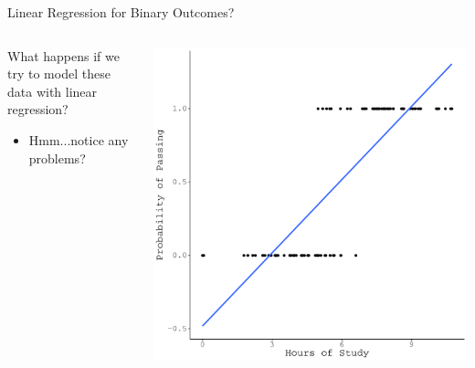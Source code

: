 \documentclass{beamer}\usepackage[]{graphicx}\usepackage[]{color}
\makeatletter
\def\maxwidth{ %
  \ifdim\Gin@nat@width>\linewidth
    \linewidth
  \else
    \Gin@nat@width
  \fi
}
\newenvironment{knitrout}{}{} %
\makeatother
\begin{document}

\begin{frame}{Linear Regression for Binary Outcomes?}

  \begin{columns}
    \begin{column}{0.5\textwidth}
      
      What happens if we try to model these data with linear regression?  
      \vb
      \begin{itemize}
      \item Hmm...notice any problems?
      \end{itemize}
      
    \end{column}
    
    \begin{column}{0.5\textwidth}
      
\begin{knitrout}\footnotesize
{}\color{fgcolor}

{\centering \includegraphics[width=\maxwidth]{figure/unnamed-chunk-2-1} 

}



\end{knitrout}

\end{column}
\end{columns}

\end{frame}
\end{document}
